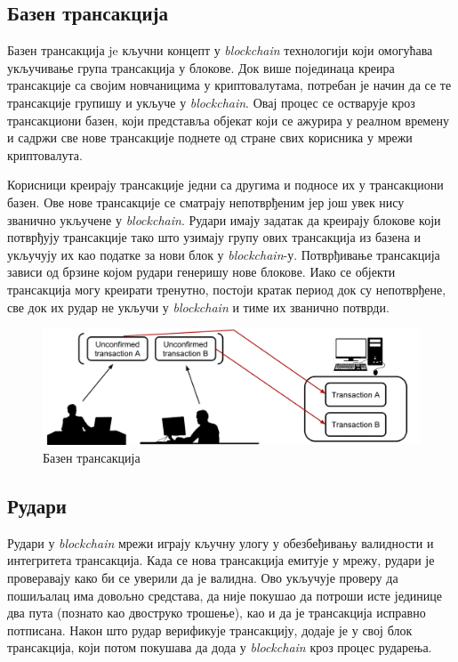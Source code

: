 \documentclass[12pt, a4paper]{article}
\begin{document}
\subsection{Базен трансакција}
Базен трансакција je кључни концепт у \textit{blockchain} технологији који омогућава укључивање група трансакција у блокове. Док више појединаца креира трансакције са својим новчаницима у криптовалутама, потребан је начин да се те трансакције групишу и укључе у \textit{blockchain}. Овај процес се остварује кроз трансакциони базен, који представља објекат који се ажурира у реалном времену и садржи све нове трансакције поднете од стране свих корисника у мрежи криптовалута.

Корисници креирају трансакције једни са другима и подносе их у трансакциони базен. Ове нове трансакције се сматрају непотврђеним јер још увек нису званично укључене у \textit{blockchain}. Рудари имају задатак да креирају блокове који потврђују трансакције тако што узимају групу ових трансакција из базена и укључују их као податке за нови блок у \textit{blockchain}-у. Потврђивање трансакција зависи од брзине којом рудари генеришу нове блокове. Иако се објекти трансакција могу креирати тренутно, постоји кратак период док су непотврђене, све док их рудар не укључи у \textit{blockchain} и тиме их званично потврди.

\begin{figure}[h]
    \centering
    \includegraphics[width=1\linewidth]{slike/transaction-pool.png}
    \caption{Базен трансакција}
    \label{fig:transaction-pool}
\end{figure}

\subsection{Рудари}
Рудари у \textit{blockchain} мрежи играју кључну улогу у обезбеђивању валидности и интегритета трансакција. Када се нова трансакција емитује у мрежу, рудари је проверавају како би се уверили да је валидна. Ово укључује проверу да пошиљалац има довољно средстава, да није покушао да потроши исте јединице два пута (познато као двоструко трошење), као и да је трансакција исправно потписана. Након што рудар верификује трансакцију, додаје је у свој блок трансакција, који потом покушава да дода у \textit{blockchain} кроз процес рударења.
\end{document}
